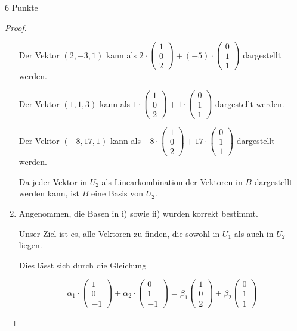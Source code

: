 \documentclass{problemset}
\begin{document}
\begin{problem}{6 Punkte}
\begin{proof}
\begin{enumerate}
		      Der Vektor $(2, -3, 1)$ kann als $2 \cdot \begin{pmatrix} 1 \\ 0 \\ 2 \end{pmatrix} + (-5) \cdot \begin{pmatrix} 0 \\ 1 \\ 1 \end{pmatrix}$ dargestellt werden.

		      Der Vektor $(1, 1, 3)$ kann als $1 \cdot \begin{pmatrix} 1 \\ 0 \\ 2 \end{pmatrix} + 1 \cdot \begin{pmatrix} 0 \\ 1 \\ 1 \end{pmatrix}$ dargestellt werden.

		      Der Vektor $(-8, 17, 1)$ kann als $-8 \cdot \begin{pmatrix} 1 \\ 0 \\ 2 \end{pmatrix} + 17 \cdot \begin{pmatrix} 0 \\ 1 \\ 1 \end{pmatrix}$ dargestellt werden.

		      Da jeder Vektor in $U_2$ als Linearkombination der Vektoren in $B$ dargestellt werden kann, ist $B$ eine Basis von $U_2$.

		\item Angenommen, die Basen in i) sowie ii) wurden korrekt bestimmt.

		      Unser Ziel ist es, alle Vektoren zu finden, die sowohl in \(U_1\) als auch in \(U_2\) liegen.

		      Dies lässt sich durch die Gleichung

		      \[
			      \alpha_1 \cdot \begin{pmatrix}
				      1 \\
				      0 \\
				      -1
			      \end{pmatrix} + \alpha_2 \cdot \begin{pmatrix}
				      0 \\
				      1 \\
				      -1
			      \end{pmatrix} = \beta_1 \begin{pmatrix}
				      1 \\ 0 \\ 2
			      \end{pmatrix} + \beta_2 \begin{pmatrix}
				      0 \\ 1 \\ 1
			      \end{pmatrix}
		      \]


\end{enumerate}
\end{proof}
\end{problem}
\end{document}
